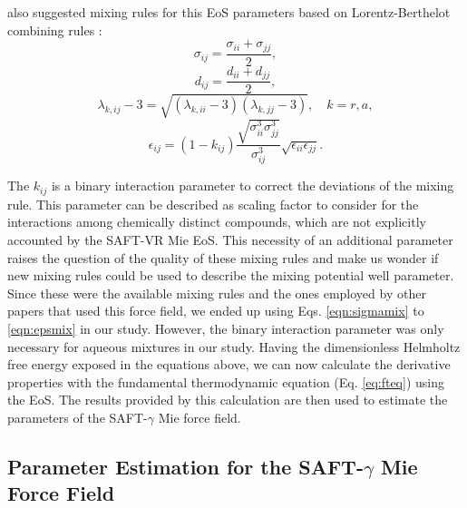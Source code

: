  also suggested mixing rules for this EoS parameters based on Lorentz-Berthelot combining rules \cite{rowlinson}:
\begin{equation}
\sigma_{ij} =\frac{\sigma_{ii}+\sigma_{jj}}{2},
\label{eqn:sigmamix}
\end{equation}
\begin{equation}
d_{ij} =\frac{d_{ii}+d_{jj}}{2},
\label{eqn:dmix}
\end{equation}
\begin{equation}
\lambda_{k,ij} -3 =\sqrt{(\lambda_{k,ii}-3)(\lambda_{k,jj}-3)},  \quad k=r,a,
\label{eqn:lambdamix}
\end{equation}
\begin{equation}
\epsilon_{ij} =(1-k_{ij})\frac{\sqrt{\sigma_{ii}^{3}\sigma_{jj}^{3}}}{\sigma_{ij}^{3}}\sqrt{\epsilon_{ii}\epsilon_{jj}}.
\label{eqn:epsmix}
\end{equation}

The $k_{ij}$ is a binary interaction parameter to correct the deviations of the mixing rule. This parameter can be described as scaling factor to consider for the interactions among chemically distinct compounds, which are not explicitly accounted by the SAFT-VR Mie EoS. This necessity of an additional parameter raises the question of the quality of these mixing rules and make us wonder if new mixing rules could be used to describe the mixing potential well parameter. Since these were the available mixing rules and the ones employed by other papers that used this force field, we ended up using Eqs. \ref{eqn:sigmamix} to \ref{eqn:epsmix} in our study. However, the binary interaction parameter was only necessary for aqueous mixtures in our study.  Having the dimensionless Helmholtz free energy exposed in the equations above, we can now calculate the derivative properties with the fundamental thermodynamic equation (Eq. \ref{eq:fteq}) using the EoS. The results provided by this calculation are then used to estimate the parameters of the SAFT-$\gamma$ Mie force field. 


\subsection{Parameter Estimation for the SAFT-$\gamma$ Mie Force Field}\label{parsaft}

